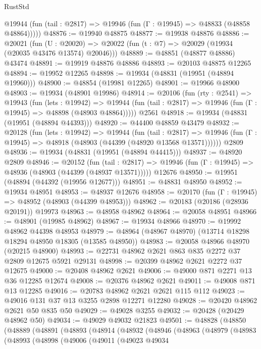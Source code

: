 \begin{lexlean}{RustStd}
\begin{coremodule}
      @19944 (fun (tail : @2817) => @19946 (fun (Γ : @19945) => @48833 (@48858 @48864)))))
@48876 := @19940 @48875
@48877 := @19938 @48876
@48886 := @20021
    (fun (U : @20020) => @20022 (fun (t : @7) => @20029 (@19934 (@20035 @43476 @13574) @20046)))
@48889 := @48851 (@48877 @48886) @43474
@48891 := @19919 @48876 @48886
@48893 := @20103 @48875 @12265
@48894 := @19952 @12265
@48898 := @19934 (@48831 (@19951 (@48894 @19960)))
@48900 := @48854 (@19981 @12265)
@48901 := @19966 @48900
@48903 := @19934 (@48901 @19986)
@48914 := @20106
    (fun (rty : @2541) =>
    @19943
      (fun (lets : @19942) =>
      @19944 (fun (tail : @2817) => @19946 (fun (Γ : @19945) => @48898 (@48903 @48864)))))
    @2561
@48918 := @19934 (@48831 (@19951 (@48894 @44393)))
@48920 := @44400 @48859 @43479
@48932 := @20128
    (fun (lets : @19942) =>
    @19944
      (fun (tail : @2817) =>
      @19946 (fun (Γ : @19945) => @48918 (@48903 (@44399 (@48920 @13568 @13571))))))
    @2809
@48936 := @19934 (@48831 (@19951 (@48894 @44415)))
@48937 := @48920 @2809
@48946 := @20152
    (fun (tail : @2817) => @19946 (fun (Γ : @19945) => @48936 (@48903 (@44399 (@48937 @13571)))))
    @12676
@48950 := @19951 (@48894 (@44392 (@19956 @12677)))
@48951 := @48831 @48950
@48952 := @19934 @48951
@48953 := @48937 @12676
@48958 := @20170 (fun (Γ : @19945) => @48952 (@48903 (@44399 @48953)))
@48962 := @20183 (@20186 (@28936 @20191)) @19973
@48963 := @48958 @48962
@48964 := @20058 @48951
@48966 := @48901 (@19985 @48962)
@48967 := @19934 @48966
@48970 := @19992 @48962 @44398 @48953
@48979 := @48964 (@48967 @48970) (@13714 @18298 @18294 @48950 @18305 (@13585 @48950))
@48983 := @20058 @48966 @48970 (@20215 @48900)
@48993 := @22731 @48962 @2621 @863 @835 @2272 @37 @2809 @12675 @5921 @29131
@48998 := @20399 @48962 @2621 @2272 @37 @12675
@49000 := @20408 @48962 @2621
@49006 := @49000 @871 @2271 @13 @36 @12285 @12674
@49008 := @20376 @48962 @2621
@49011 := @49008 @871 @13 @12285
@49016 := @20783 @48962 @2621 @2621 @115 @112
@49023 := @49016 @131 @37 @13 @3255 @2898 @12271 @12280
@49028 := @20420 @48962 @2621 @50 @835 @50
@49029 := @49028 @3255
@49032 := @20428 (@20429 @48962 @50)
@49034 := @49029 @49032 @21823
@49501 := @48828
    (@48850
      (@48889
        (@48891
          (@48893
            (@48914
              (@48932
                (@48946
                  (@48963
                    (@48979
                      (@48983
                        (@48993
                          (@48998
                            (@49006
                              (@49011
                                (@49023
                                  @49034

\end{coremodule}
\end{lexlean}
